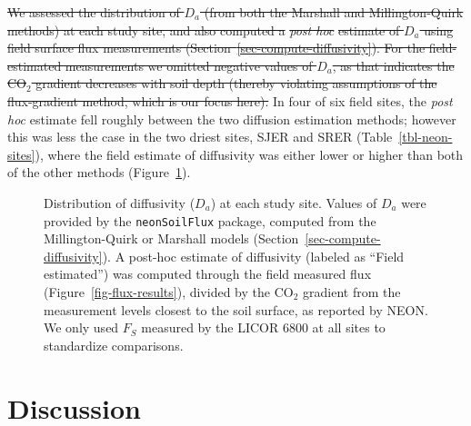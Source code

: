 \documentclass[
  letterpaper,
  DIV=11,
  numbers=noendperiod]{scrartcl}
\providecommand{\DIFadd}[1]{{\protect\color{blue}\uwave{#1}}} %
\providecommand{\DIFdel}[1]{{\protect\color{red}\sout{#1}}}                      %
\providecommand{\DIFaddbegin}{} %
\providecommand{\DIFaddend}{} %
\providecommand{\DIFdelbegin}{} %
\providecommand{\DIFdelend}{} %
\newcommand{\DIFscaledelfig}{0.5}
\newlength{\DIFdelgraphicswidth} %
\newlength{\DIFdelgraphicsheight} %
\newcommand{\DIFaddincludegraphics}[2][]{{\color{blue}\fbox{\DIFOincludegraphics[#1]{#2}}}} %
\newcommand{\DIFdelincludegraphics}[2][]{%
\sbox{\DIFdelgraphicsbox}{\DIFOincludegraphics[#1]{#2}}%
\settoboxwidth{\DIFdelgraphicswidth}{\DIFdelgraphicsbox} %
\settoboxtotalheight{\DIFdelgraphicsheight}{\DIFdelgraphicsbox} %
\scalebox{\DIFscaledelfig}{%
\parbox[b]{\DIFdelgraphicswidth}{\usebox{\DIFdelgraphicsbox}\\[-\baselineskip] \rule{\DIFdelgraphicswidth}{0em}}\llap{\resizebox{\DIFdelgraphicswidth}{\DIFdelgraphicsheight}{%
\setlength{\unitlength}{\DIFdelgraphicswidth}%
\begin{picture}(1,1)%
\thicklines\linethickness{2pt} %
{\color[rgb]{1,0,0}\put(0,0){\framebox(1,1){}}}%
{\color[rgb]{1,0,0}\put(0,0){\line( 1,1){1}}}%
{\color[rgb]{1,0,0}\put(0,1){\line(1,-1){1}}}%
\end{picture}%
}\hspace*{3pt}}} %
} %
\DeclareRobustCommand{\DIFaddbegin}{\DIFOaddbegin \let\includegraphics\DIFaddincludegraphics} %
\DeclareRobustCommand{\DIFaddend}{\DIFOaddend \let\includegraphics\DIFOincludegraphics} %
\DeclareRobustCommand{\DIFdelbegin}{\DIFOdelbegin \let\includegraphics\DIFdelincludegraphics} %
\DeclareRobustCommand{\DIFdelend}{\DIFOaddend \let\includegraphics\DIFOincludegraphics} %
\begin{document}
\DIFdelbegin \DIFdel{We assessed the distribution of \(D_{a}\) (from both the Marshall and
Millington-Quirk methods) at each study site, and also computed a
}\emph{\DIFdel{post hoc}} %
\DIFdel{estimate of \(D_{a}\) using field surface flux
measurements (Section~\ref{sec-compute-diffusivity}). For the
field-estimated measurements we omitted negative values of \(D_{a}\), as
that indicates the CO\(_{2}\) gradient decreases with soil depth
(thereby violating assumptions of the flux-gradient method, which is our
focus here). }\DIFdelend In four of six field sites, the \emph{post hoc} \DIFaddbegin \DIFadd{\(D_{a}\) }\DIFaddend estimate fell
roughly between the two diffusion estimation methods; however this was
less the case in the two driest sites, SJER and SRER
(Table~\ref{tbl-neon-sites}), where the field estimate of diffusivity
was either lower or higher than both of the other methods
(Figure~\ref{fig-diffusivity-plot}).

\begin{figure}


\caption{\label{fig-diffusivity-plot}Distribution of diffusivity
(\(D_{a}\)) at each study site. Values of \(D_{a}\) were provided by the
\texttt{neonSoilFlux} package, computed from the Millington-Quirk or
Marshall models (Section~\ref{sec-compute-diffusivity}). A post-hoc
estimate of diffusivity (labeled as ``Field estimated'') was computed
through the field measured flux (Figure~\ref{fig-flux-results}), divided
by the CO\(_{2}\) gradient from the measurement levels closest to the
soil surface, as reported by NEON. We only used \(F_{S}\) measured by
the LICOR 6800 at all sites to standardize comparisons.}

\end{figure}%

\section{Discussion}\label{sec-discussion}
\end{document}
